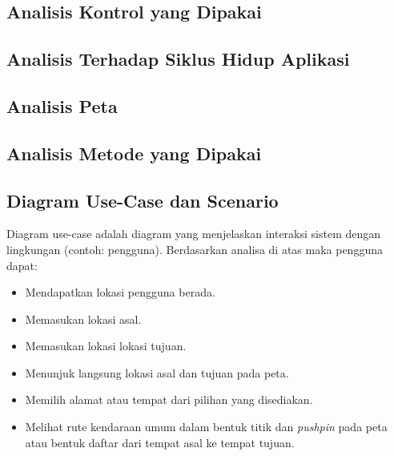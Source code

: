 \subsection{Analisis Kontrol yang Dipakai}
\label{lab:Analisis Kontrol yang Dipakai}

\subsection{Analisis Terhadap Siklus Hidup Aplikasi}
\label{lab:Analisis Terhadap Siklus Hidup Aplikasi}

\subsection{Analisis Peta}
\label{lab:Analisis Peta}

\subsection{Analisis Metode yang Dipakai}
\label{lab:Analisis Metode yang Dipakai}


\subsection{Diagram Use-Case dan Scenario}
\label{lab:Diagram Use-Case dan Scenario}
\hspace{0.5cm} Diagram use-case adalah diagram yang menjelaskan interaksi sistem dengan lingkungan (contoh: pengguna). Berdasarkan analisa di atas maka pengguna dapat:
\begin{itemize}
	\item Mendapatkan lokasi pengguna berada.
	\item Memasukan lokasi asal.
	\item Memasukan lokasi lokasi tujuan.
	\item Menunjuk langsung lokasi asal dan tujuan pada peta.
	\item Memilih alamat atau tempat dari pilihan yang disediakan.
	\item Melihat rute kendaraan umum dalam bentuk titik dan \textit{pushpin} pada peta atau bentuk daftar dari tempat asal ke tempat tujuan.
\end{itemize}

